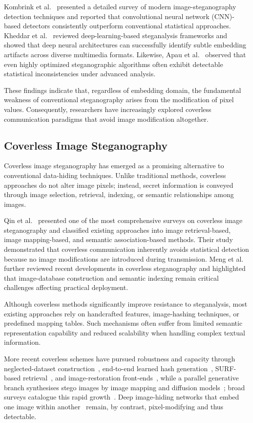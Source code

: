 \documentclass[11pt]{article}
\theoremstyle{definition}
\begin{document}
Kombrink et al.\ \cite{kombrink} presented a detailed survey of modern image-steganography
detection techniques and reported that convolutional neural network (CNN)-based
detectors consistently outperform conventional statistical approaches. Kheddar
et al.\ \cite{kheddar} reviewed deep-learning-based steganalysis frameworks and showed that
deep neural architectures can successfully identify subtle embedding artifacts
across diverse multimedia formats. Likewise, Apau et al.\ \cite{apau} observed that even
highly optimized steganographic algorithms often exhibit detectable statistical
inconsistencies under advanced analysis.

These findings indicate that, regardless of embedding domain, the fundamental
weakness of conventional steganography arises from the modification of pixel values.
Consequently, researchers have increasingly explored coverless communication
paradigms that avoid image modification altogether.

\subsection{Coverless Image Steganography}
Coverless image steganography has emerged as a promising alternative to conventional
data-hiding techniques. Unlike traditional methods, coverless approaches do not
alter image pixels; instead, secret information is conveyed through image selection,
retrieval, indexing, or semantic relationships among images.

Qin et al.\ \cite{qin} presented one of the most comprehensive surveys on coverless image
steganography and classified existing approaches into image retrieval-based, image
mapping-based, and semantic association-based methods. Their study demonstrated that
coverless communication inherently avoids statistical detection because no image
modifications are introduced during transmission. Meng et al.\ \cite{mengReview} further reviewed
recent developments in coverless steganography and highlighted that image-database
construction and semantic indexing remain critical challenges affecting practical
deployment.

Although coverless methods significantly improve resistance to steganalysis, most
existing approaches rely on handcrafted features, image-hashing techniques, or
predefined mapping tables. Such mechanisms often suffer from limited semantic
representation capability and reduced scalability when handling complex textual
information.

More recent coverless schemes have pursued robustness and capacity through neglected-dataset construction~\cite{neglected2022}, end-to-end learned hash generation~\cite{end2endHash2023}, SURF-based retrieval~\cite{surf2024}, and image-restoration front-ends~\cite{restoration2024}, while a parallel generative branch synthesises stego images by image mapping and diffusion models~\cite{imageMapping2024,diffstega2024}; broad surveys catalogue this rapid growth~\cite{coverlessSurvey2024,dlSurvey2024}. Deep image-hiding networks that embed one image within another~\cite{baluja2017,tancik2020} remain, by contrast, pixel-modifying and thus detectable.
\end{document}
